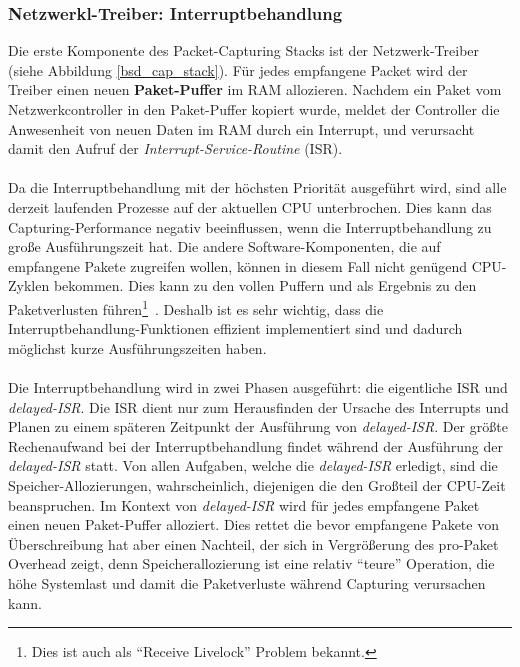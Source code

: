 \subsubsection{Netzwerkl-Treiber: Interruptbehandlung}\label{sec:intr_behandlung}
Die erste Komponente des Packet-Capturing Stacks ist der Netzwerk-Treiber
(siehe Abbildung \ref{bsd_cap_stack}). Für jedes empfangene Packet wird der
Treiber einen neuen \textbf{Paket-Puffer} im RAM allozieren. Nachdem ein Paket
vom Netzwerkcontroller in den Paket-Puffer kopiert wurde, meldet der Controller
die Anwesenheit von neuen Daten im RAM durch ein Interrupt, und verursacht
damit den Aufruf der \emph{Interrupt-Service-Routine} (ISR).\\\\ 
%
Da die Interruptbehandlung mit der höchsten Priorität ausgeführt wird, sind
alle derzeit laufenden Prozesse auf der aktuellen CPU unterbrochen. Dies kann
das Capturing-Performance negativ beeinflussen, wenn die Interruptbehandlung zu
große  Ausführungszeit hat. Die andere Software-Komponenten, die auf empfangene
Pakete zugreifen wollen, können in diesem Fall nicht genügend CPU-Zyklen
bekommen.  Dies kann zu den vollen Puffern und als Ergebnis zu den
Paketverlusten führen\footnote{Dies ist auch als ``Receive Livelock'' Problem
bekannt.}~\cite{elim_recv_lock}. Deshalb ist es sehr wichtig, dass die
Interruptbehandlung-Funktionen effizient implementiert sind und dadurch
möglichst kurze Ausführungszeiten haben.\\\\
%
Die Interruptbehandlung wird in zwei Phasen ausgeführt: die eigentliche ISR und
\emph{delayed-ISR}. Die ISR dient nur zum Herausfinden der Ursache des
Interrupts und Planen zu einem späteren Zeitpunkt der Ausführung von
\emph{delayed-ISR}. Der größte Rechenaufwand bei der Interruptbehandlung findet
während der Ausführung der \emph{delayed-ISR} statt.  Von allen Aufgaben, welche
die \emph{delayed-ISR} erledigt, sind die Speicher-Allozierungen,
wahrscheinlich, diejenigen die den Großteil der CPU-Zeit beanspruchen. Im Kontext von \emph{delayed-ISR} wird für jedes empfangene
Paket einen neuen Paket-Puffer alloziert. Dies rettet die bevor empfangene
Pakete von Überschreibung hat aber einen Nachteil, der sich in Vergrößerung des
pro-Paket Overhead zeigt, denn Speicherallozierung ist eine relativ ``teure''
Operation, die höhe Systemlast und damit die Paketverluste während Capturing
verursachen kann.
%
